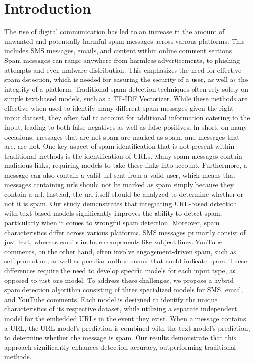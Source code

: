 \documentclass{article}
\begin{document}
\section{Introduction}
The rise of digital communication has led to an increase in the amount of unwanted and potentially harmful spam messages across various platforms. This includes SMS messages, emails, and content within online comment sections. Spam messages can range anywhere from harmless advertisements, to phishing attempts and even malware distribution. This emphasizes the need for effective spam detection, which is needed for ensuring the security of a user, as well as the integrity of a platform. Traditional spam detection techniques often rely solely on simple text-based models, such as a TF-IDF Vectorizer. While these methods are effective when used to identify many different spam messages given the right input dataset, they often fail to account for additional information catering to the input, leading to both false negatives as well as false positives. In short, on many occasions, messages that are not spam are marked as spam, and messages that are, are not.
\newline
\newline
One key aspect of spam identification that is not present within traditional methods is the identification of URLs. Many spam messages contain malicious links, requiring models to take these links into account. Furthermore, a message can also contain a valid url sent from a valid user, which means that messages containing urls should not be marked as spam simply because they contain a url. Instead, the url itself should be analyzed to determine whether or not it is spam. Our study demonstrates that integrating URL-based detection with text-based models significantly improves the ability to detect spam, particularly when it comes to wrongful spam detection.
\newline
\newline
Moreover, spam characteristics differ across various platforms. SMS messages primarily consist of just text, whereas emails include components like subject lines. YouTube comments, on the other hand, often involve engagement-driven spam, such as self-promotion; as well as peculiar author names that could indicate spam. These differences require the need to develop specific models for each input type, as opposed to just one model.
\newline
\newline
To address these challenges, we propose a hybrid spam detection algorithm consisting of three specialized models for SMS, email, and YouTube comments. Each model is designed to identify the unique characteristics of its respective dataset, while utilizing a separate independent model for the embedded URLs in the event they exist. When a message contains a URL, the URL model’s prediction is combined with the text model’s prediction, to determine whether the message is spam. Our results demonstrate that this approach significantly enhances detection accuracy, outperforming traditional methods.
\end{document}
